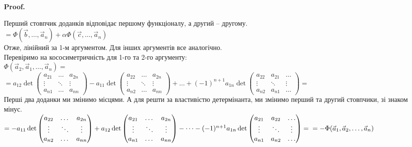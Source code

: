 \documentclass[a4paper, 10pt]{article}
\makeatletter
\theoremstyle{theoremdd}
\renewenvironment{proof}[1][Proof.\\]{\par
\pushQED{\hfill \qed}%
\normalfont \topsep6\p@\@plus6\p@\relax
\trivlist
\item\relax
{\bfseries
#1\@addpunct{.}}\hspace\labelsep\ignorespaces
}{%
\popQED\endtrivlist\@endpefalse
}
\makeatother
\begin{document}
\begin{proof}
Перший стовпчик доданків відповідає першому функціоналу, а другий -- другому.\\
$= \Phi(\vec{b}, \dots, \vec{a}_n) + \alpha \Phi(\vec{c},\dots, \vec{a}_n)$\\
Отже, лінійний за 1-м аргументом. Для інших аргументів все аналогічно.
\bigskip \\
Перевіримо на кососиметричність для 1-го та 2-го аргументу:\\
$\Phi(\vec{a}_2,\vec{a}_1,\dots,\vec{a}_n) = $\\
$= a_{12} \det \begin{pmatrix} a_{21} & \dots & a_{2n} \\ \vdots & \ddots & \vdots \\ a_{n1} & \dots & a_{nn} \end{pmatrix} - a_{11} \det \begin{pmatrix} a_{22} & \dots & a_{2n} \\ \vdots & \ddots & \vdots \\ a_{n2} & \dots & a_{nn} \end{pmatrix} + \dots + (-1)^{n+1} a_{1n} \det \begin{pmatrix} a_{22} & a_{21} & \dots \\ \vdots & \ddots & \vdots \\ a_{n2} & a_{n1} & \dots \end{pmatrix} = $\\
Перші два доданки ми змінимо місцями. А для решти за властивістю детермінанта, ми змінимо перший та другий стовпчики, зі знаком мінус.\\
$= - a_{11} \det \begin{pmatrix} a_{22} & \dots & a_{2n} \\ \vdots & \ddots & \vdots \\ a_{n2} & \dots & a_{nn} \end{pmatrix} + a_{12} \det \begin{pmatrix} a_{21} & \dots & a_{2n} \\ \vdots & \ddots & \vdots \\ a_{n1} & \dots & a_{nn} \end{pmatrix} - \dots - (-1)^{n+1} a_{1n} \det \begin{pmatrix} a_{21} & a_{22} & \dots \\ \vdots & \ddots & \vdots \\ a_{n1} & a_{n2} & \dots \end{pmatrix} = \\ = -\Phi(\vec{a}_1,\vec{a}_2,\dots,\vec{a}_n)$\\

\end{proof}
\end{document}
